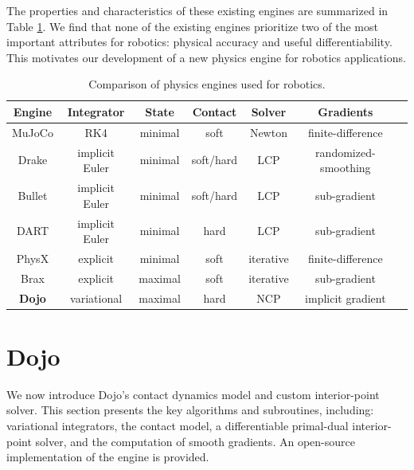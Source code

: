 The properties and characteristics of these existing engines are summarized in Table \ref{dojo_engine_comparison}. We find that none of the existing engines prioritize two of the most important attributes for robotics: physical accuracy and useful differentiability. This motivates our development of a new physics engine for robotics applications.

\begin{table}[H]
	\centering
	\caption[Comparison of physics engines used for robotics]{Comparison of physics engines used for robotics.}
	\small
	\begin{tabular}{c c c c c c c}
		\toprule
		\textbf{Engine} & \textbf{Integrator} & \textbf{State} & \textbf{Contact} & \textbf{Solver} & \textbf{Gradients} \\
		\toprule
		MuJoCo \cite{todorov2012mujoco} & RK4 & minimal & soft & Newton & finite-difference \\
		Drake \cite{drake} & implicit Euler & minimal & soft/hard & LCP & randomized-smoothing\\
		Bullet \cite{coumans2019} & implicit Euler & minimal & soft/hard & LCP & sub-gradient \\
		DART \cite{lee2018dart} & implicit Euler & minimal & hard & LCP & sub-gradient\\
		PhysX \cite{physx2022engine} & explicit & minimal & soft & iterative & finite-difference \\
		Brax \cite{freeman2021brax} & explicit & maximal & soft & iterative & sub-gradient\\
		\hline
		\textbf{Dojo} & variational & maximal & hard & NCP & implicit gradient \\
		\toprule
	\end{tabular}
	\label{dojo_engine_comparison}
\end{table}

\section{Dojo} \label{dojo}

We now introduce Dojo's contact dynamics model and custom interior-point solver. This section presents the key algorithms and subroutines, including: variational integrators, the contact model, a differentiable primal-dual interior-point solver, and the computation of smooth gradients. An open-source implementation of the engine is provided.

